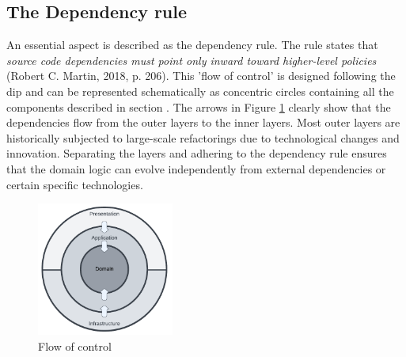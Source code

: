 \subsection{The Dependency rule} \label{subsec_dependency_rule}

An essential aspect is described as the dependency rule. The rule states that
\textit{source code dependencies must point only inward toward higher-level policies}
(Robert C. Martin, 2018, p. 206). This ’flow of control’ is designed following the
\gls{dip} and can be represented schematically as concentric circles containing all the
components described in section . The arrows in Figure
\ref{fig_modulair_components} clearly show that the dependencies flow from the outer
layers to the inner layers. Most outer layers are historically subjected to large-scale
refactorings due to technological changes and innovation. Separating the layers and adhering
to the dependency rule ensures that the domain logic can evolve independently from
external dependencies or certain specific technologies.

\begin{figure}[H]
    \centering
    \includegraphics[width=0.4\textwidth]{figures/ca_diagram.pdf}
    \caption[Flow of control]{Flow of control}
    \label{fig_modulair_components}
\end{figure}